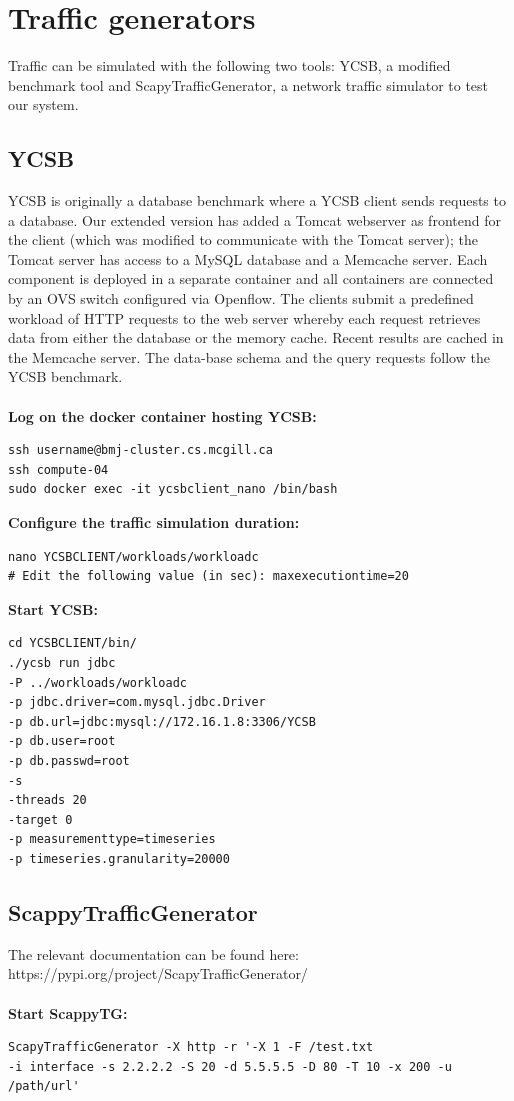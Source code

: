 \documentclass[12pt,hidelinks]{article}
\begin{document}
\section{Traffic generators}	
Traffic can be simulated with the following two tools: YCSB, a modified benchmark tool and ScapyTrafficGenerator, a network traffic simulator to test our system.

\subsection{YCSB}
YCSB is originally a database benchmark where a YCSB client sends requests to a database. Our extended version has added a Tomcat webserver as frontend for the client (which was modified to communicate with the Tomcat server); the Tomcat server has access to a MySQL database and a Memcache server. Each component is deployed in a separate container and all containers are connected by an OVS switch configured via Openflow. The clients submit a predefined workload of HTTP requests to the web server whereby each request retrieves data from either the database or the memory cache. Recent results are cached in the Memcache server. The data-base schema and the query requests follow the YCSB benchmark. \\
\\
\textbf{Log on the docker container hosting YCSB:}
\begin{verbatim}
ssh username@bmj-cluster.cs.mcgill.ca
ssh compute-04
sudo docker exec -it ycsbclient_nano /bin/bash
\end{verbatim}
\textbf{Configure the traffic simulation duration:}
\begin{verbatim}
nano YCSBCLIENT/workloads/workloadc
# Edit the following value (in sec): maxexecutiontime=20
\end{verbatim}
\textbf{Start YCSB:}
\begin{verbatim}
cd YCSBCLIENT/bin/
./ycsb run jdbc 
-P ../workloads/workloadc 
-p jdbc.driver=com.mysql.jdbc.Driver
-p db.url=jdbc:mysql://172.16.1.8:3306/YCSB 
-p db.user=root 
-p db.passwd=root 
-s 
-threads 20 
-target 0 
-p measurementtype=timeseries 
-p timeseries.granularity=20000
\end{verbatim}
\subsection{ScappyTrafficGenerator}\label{subsec:mathenvironments}
The relevant documentation can be found here: https://pypi.org/project/ScapyTrafficGenerator/ \\
\\
\textbf{Start ScappyTG:} 
\begin{verbatim}
ScapyTrafficGenerator -X http -r '-X 1 -F /test.txt 
-i interface -s 2.2.2.2 -S 20 -d 5.5.5.5 -D 80 -T 10 -x 200 -u /path/url'
\end{verbatim}
\end{document}
